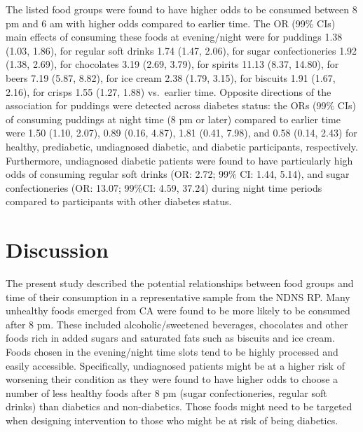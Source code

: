 \documentclass[utf8]{frontiersSCNS}
\begin{document}
The listed food groups were found to have higher odds to be consumed
between 8 pm and 6 am with higher odds compared to earlier time. The OR
(99\% CIs) main effects of consuming these foods at evening/night were
for puddings 1.38 (1.03, 1.86), for regular soft drinks 1.74 (1.47,
2.06), for sugar confectioneries 1.92 (1.38, 2.69), for chocolates 3.19
(2.69, 3.79), for spirits 11.13 (8.37, 14.80), for beers 7.19 (5.87,
8.82), for ice cream 2.38 (1.79, 3.15), for biscuits 1.91 (1.67, 2.16),
for crisps 1.55 (1.27, 1.88) vs.~earlier time. Opposite directions of
the association for puddings were detected across diabetes status: the
ORs (99\% CIs) of consuming puddings at night time (8 pm or later)
compared to earlier time were 1.50 (1.10, 2.07), 0.89 (0.16, 4.87), 1.81
(0.41, 7.98), and 0.58 (0.14, 2.43) for healthy, prediabetic,
undiagnosed diabetic, and diabetic participants, respectively.
Furthermore, undiagnosed diabetic patients were found to have
particularly high odds of consuming regular soft drinks (OR: 2.72; 99\%
CI: 1.44, 5.14), and sugar confectioneries (OR: 13.07; 99\%CI: 4.59,
37.24) during night time periods compared to participants with other
diabetes status.

\hypertarget{discussion}{%
\section*{Discussion}\label{discussion}}

The present study described the potential relationships between food
groups and time of their consumption in a representative sample from the
NDNS RP. Many unhealthy foods emerged from CA were found to be more
likely to be consumed after 8 pm. These included alcoholic/sweetened
beverages, chocolates and other foods rich in added sugars and saturated
fats such as biscuits and ice cream. Foods chosen in the evening/night
time slots tend to be highly processed and easily accessible.
Specifically, undiagnosed patients might be at a higher risk of
worsening their condition as they were found to have higher odds to
choose a number of less healthy foods after 8 pm (sugar confectioneries,
regular soft drinks) than diabetics and non-diabetics. Those foods might
need to be targeted when designing intervention to those who might be at
risk of being diabetics.
\end{document}
